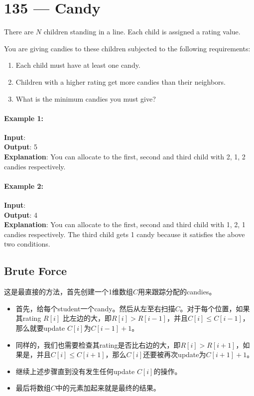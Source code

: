 \section{135 --- Candy}
There are $N$ children standing in a line. Each child is assigned a rating value.
\par
You are giving candies to these children subjected to the following requirements:
\begin{enumerate}
\item Each child must have at least one candy.
\item Children with a higher rating get more candies than their neighbors.
\item What is the minimum candies you must give?
\end{enumerate}
\paragraph{Example 1:}
\begin{flushleft}
\textbf{Input}: \fcj{[1,0,2]}
\\
\textbf{Output}: 5
\\
\textbf{Explanation}: You can allocate to the first, second and third child with 2, 1, 2 candies respectively.
\end{flushleft}
\paragraph{Example 2:}
\begin{flushleft}
\textbf{Input}: \fcj{[1,2,2]}
\\
\textbf{Output}: 4
\\
\textbf{Explanation}: You can allocate to the first, second and third child with 1, 2, 1 candies respectively. The third child gets 1 candy because it satisfies the above two conditions.
\end{flushleft}
\subsection{Brute Force}
这是最直接的方法，首先创建一个1维数组$C$用来跟踪分配的candies。
\begin{itemize}
\item 首先，给每个student一个candy。然后从左至右扫描$C$。对于每个位置，如果其rating $R[i]$ 比左边的大，即$R[i]>R[i-1]$，并且$C[i]\leq C[i-1]$，那么就要update $C[i]$为$C[i-1]+1$。
\item 同样的，我们也需要检查其rating是否比右边的大，即$R[i]>R[i+1]$，如果是，并且$C[i] \leq C[i+1]$，那么$C[i]$还要被再次update为$C[i+1]+1$。
\item 继续上述步骤直到没有发生任何update $C[i]$的操作。
\item 最后将数组$C$中的元素加起来就是最终的结果。
\end{itemize}
